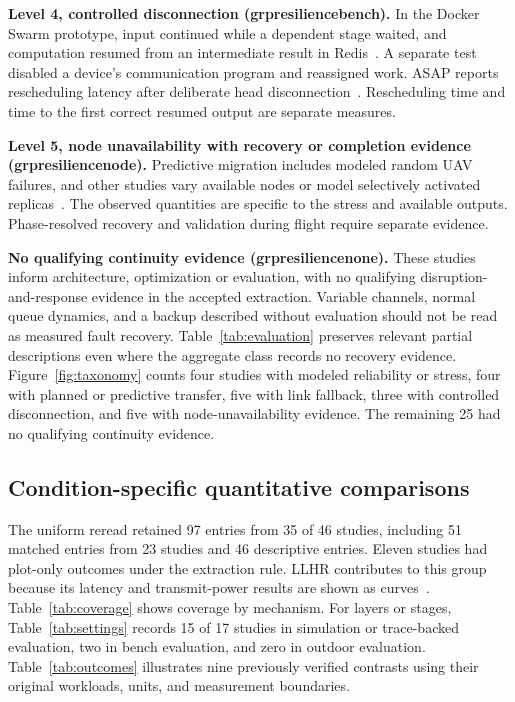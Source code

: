 \documentclass[pdflatex,sn-vancouver-num]{sn-jnl}
\newcommand{\groupcite}[2]{\csname grp#1#2\endcsname}
\begin{document}
\textbf{Level 4, controlled disconnection (\groupcite{resilience}{bench}).}
In the Docker Swarm prototype, input continued while a dependent stage waited, and computation resumed from an intermediate result in Redis~\cite{R0038}. A separate test disabled a device's communication program and reassigned work. ASAP reports rescheduling latency after deliberate head disconnection~\cite{R0062,R0014}. Rescheduling time and time to the first correct resumed output are separate measures.

\textbf{Level 5, node unavailability with recovery or completion evidence (\groupcite{resilience}{node}).}
Predictive migration includes modeled random UAV failures, and other studies vary available nodes or model selectively activated replicas~\cite{R0002,R0073,R0106,R0110}. The observed quantities are specific to the stress and available outputs. Phase-resolved recovery and validation during flight require separate evidence.

\textbf{No qualifying continuity evidence (\groupcite{resilience}{none}).}
These studies inform architecture, optimization or evaluation, with no qualifying disruption-and-response evidence in the accepted extraction. Variable channels, normal queue dynamics, and a backup described without evaluation should not be read as measured fault recovery. Table~\ref{tab:evaluation} preserves relevant partial descriptions even where the aggregate class records no recovery evidence. Figure~\ref{fig:taxonomy} counts four studies with modeled reliability or stress, four with planned or predictive transfer, five with link fallback, three with controlled disconnection, and five with node-unavailability evidence. The remaining 25 had no qualifying continuity evidence.
\FloatBarrier

\subsection{Condition-specific quantitative comparisons}
The uniform reread retained 97 entries from 35 of 46 studies, including 51 matched entries from 23 studies and 46 descriptive entries. Eleven studies had plot-only outcomes under the extraction rule. LLHR contributes to this group because its latency and transmit-power results are shown as curves~\cite{R0082}. Table~\ref{tab:coverage} shows coverage by mechanism. For layers or stages, Table~\ref{tab:settings} records 15 of 17 studies in simulation or trace-backed evaluation, two in bench evaluation, and zero in outdoor evaluation. Table~\ref{tab:outcomes} illustrates nine previously verified contrasts using their original workloads, units, and measurement boundaries.
\end{document}

